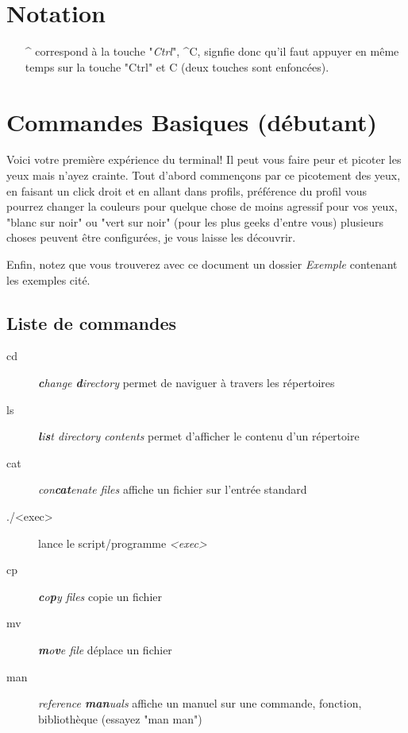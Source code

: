 \documentclass[french, a4paper, 12pt, titlepage]{article}
\begin{document}
\section{Notation}
\begin{enumerate}
\item[\^{}] correspond à la touche "\emph{Ctrl}", \^{}C, signfie donc qu'il faut appuyer en même temps sur la touche "Ctrl" et C (deux touches sont enfoncées).
\end{enumerate}

\section{Commandes Basiques (débutant)}
Voici votre première expérience du terminal!
Il peut vous faire peur et picoter les yeux mais n'ayez crainte. Tout d'abord commençons par ce picotement des yeux, en faisant un click droit et en allant dans profils, préférence du profil vous pourrez changer la couleurs pour quelque chose de moins agressif pour vos yeux, "blanc sur noir" ou "vert sur noir" (pour les plus geeks d'entre vous) plusieurs choses peuvent être configurées, je vous laisse les découvrir.

Enfin, notez que vous trouverez avec ce document un dossier \emph{Exemple} contenant les exemples cité.

\subsection{Liste de commandes}
\begin{description}
\item[cd] \emph{\textbf{c}hange \textbf{d}irectory} permet de naviguer à travers les répertoires
\item[ls] \emph{\textbf{l}i\textbf{s}t directory contents} permet d'afficher le contenu d'un répertoire
\item[cat] \emph{con\textbf{cat}enate files} affiche un fichier sur l'entrée standard
\item[./<exec>] lance le script/programme \emph{<exec>}
\item[cp] \emph{\textbf{c}o\textbf{p}y files} copie un fichier
\item[mv] \emph{\textbf{m}o\textbf{v}e file} déplace un fichier
\item[man] \emph{reference \textbf{man}uals} affiche un manuel sur une commande, fonction, bibliothèque (essayez "man man")
\end{description}
\end{document}
